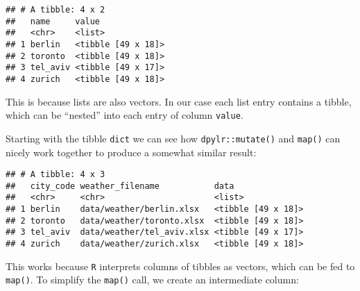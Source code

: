 \documentclass[]{book}
\newenvironment{Shaded}{\begin{snugshade}}{\end{snugshade}}
\newcommand{\DataTypeTok}[1]{\textcolor[rgb]{0.13,0.29,0.53}{#1}}
\newcommand{\KeywordTok}[1]{\textcolor[rgb]{0.13,0.29,0.53}{\textbf{#1}}}
\newcommand{\NormalTok}[1]{#1}
\newcommand{\OperatorTok}[1]{\textcolor[rgb]{0.81,0.36,0.00}{\textbf{#1}}}
\newcommand{\StringTok}[1]{\textcolor[rgb]{0.31,0.60,0.02}{#1}}
\begin{document}
\begin{verbatim}
## # A tibble: 4 x 2
##   name     value             
##   <chr>    <list>            
## 1 berlin   <tibble [49 x 18]>
## 2 toronto  <tibble [49 x 18]>
## 3 tel_aviv <tibble [49 x 17]>
## 4 zurich   <tibble [49 x 18]>
\end{verbatim}

This is because lists are also vectors.
In our case each list entry contains a tibble, which can be ``nested'' into each entry of column \texttt{value}.

Starting with the tibble \texttt{dict} we can see how \texttt{dpylr::mutate()} and \texttt{map()} can nicely work together to produce a somewhat similar result:

\begin{Shaded}
\end{Shaded}

\begin{verbatim}
## # A tibble: 4 x 3
##   city_code weather_filename           data              
##   <chr>     <chr>                      <list>            
## 1 berlin    data/weather/berlin.xlsx   <tibble [49 x 18]>
## 2 toronto   data/weather/toronto.xlsx  <tibble [49 x 18]>
## 3 tel_aviv  data/weather/tel_aviv.xlsx <tibble [49 x 17]>
## 4 zurich    data/weather/zurich.xlsx   <tibble [49 x 18]>
\end{verbatim}

This works because \texttt{R} interprets columns of tibbles as vectors, which can be fed to \texttt{map()}.
To simplify the \texttt{map()} call, we create an intermediate column:

\begin{Shaded}
\end{Shaded}
\end{document}
